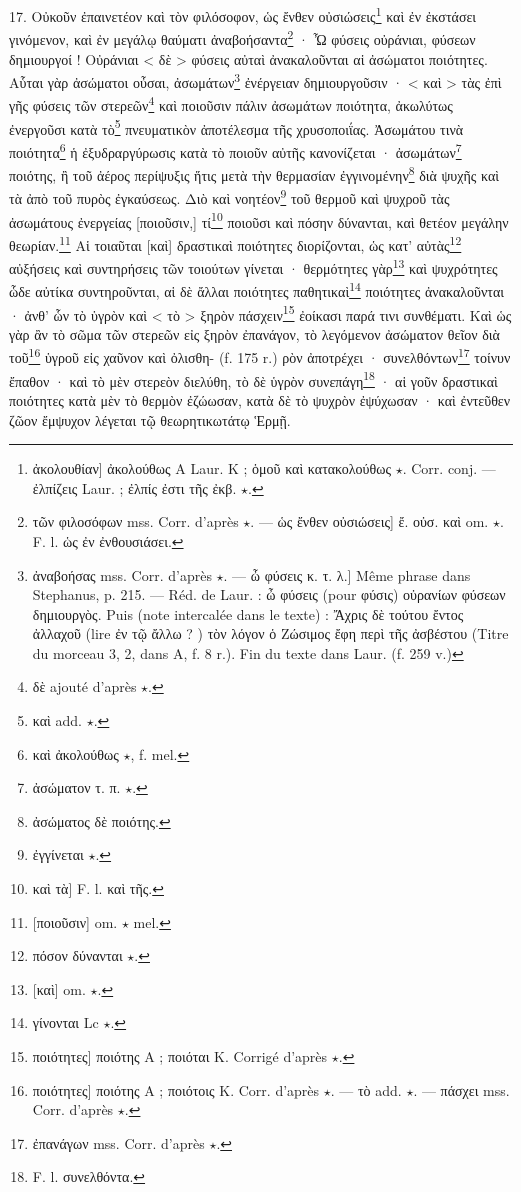 \documentclass[landscape, a4paper, 11pt, oneside, polutonikogreek, french]{article}
\begin{document}
17. Οὐκοῦν ἐπαινετέον καὶ τὸν φιλόσοφον, ὡς ἔνθεν οὐσιώσεις\footnote{ἀκολουθίαν] ἀκολούθως A Laur. K ; ὁμοῦ καὶ κατακολούθως $\star$. Corr. conj. --- ἐλπίζεις Laur. ; ἐλπίς ἐστι τῆς ἐκβ. $\star$.} καὶ ἐν ἐκστάσει γινόμενον, καὶ ἐν μεγάλῳ θαύματι ἀναβοήσαντα\footnote{τῶν φιλοσόφων mss. Corr. d'après $\star$. --- ὡς ἔνθεν οὐσιώσεις] ἔ. οὐσ. καὶ om. $\star$. F. l. ὡς ἐν ἐνθουσιάσει.} · Ὦ φύσεις οὐράνιαι, φύσεων δημιουργοί ! Οὐράνιαι < δὲ > φύσεις αὐταὶ ἀνακαλοῦνται αἱ ἀσώματοι ποιότητες. Αὗται γὰρ ἀσώματοι οὖσαι, ἀσωμάτων\footnote{ἀναβοήσας mss. Corr. d'après $\star$. --- ὦ φύσεις κ. τ. λ.] Même phrase dans Stephanus, p. 215. --- Réd. de Laur. : ὦ φύσεις (pour φύσις) οὐρανίων φύσεων δημιουργὸς. Puis (note intercalée dans le texte) : Ἄχρις δὲ τούτου ἔντος ἀλλαχοῦ (lire ἐν τῷ ἄλλω ? ) τὸν λόγον ὁ Ζώσιμος ἔφη περὶ τῆς ἀσβέστου (Titre du morceau 3, 2, dans A, f. 8 r.). Fin du texte dans Laur. (f. 259 v.)} ἐνέργειαν δημιουργοῦσιν · < καὶ > τὰς ἐπὶ γῆς φύσεις τῶν στερεῶν\footnote{δὲ ajouté d'après $\star$.} καὶ ποιοῦσιν πάλιν ἀσωμάτων ποιότητα, ἀκωλύτως ἐνεργοῦσι κατὰ τὸ\footnote{καὶ add. $\star$.} πνευματικὸν ἀποτέλεσμα τῆς χρυσοποιΐας. Ἀσωμάτου τινὰ ποιότητα\footnote{καὶ ἀκολούθως $\star$, f. mel.} ἡ ἐξυδραργύρωσις κατὰ τὸ ποιοῦν αὐτῆς κανονίζεται · ἀσωμάτων\footnote{ἀσώματον τ. π. $\star$.} ποιότης, ἢ τοῦ ἀέρος περίψυξις ἥτις μετὰ τὴν θερμασίαν ἐγγινομένην\footnote{ἀσώματος δὲ ποιότης.} διὰ ψυχῆς καὶ τὰ ἀπὸ τοῦ πυρὸς ἐγκαύσεως. Διὸ καὶ νοητέον\footnote{ἐγγίνεται $\star$.} τοῦ θερμοῦ καὶ ψυχροῦ τὰς ἀσωμάτους ἐνεργείας [ποιοῦσιν,] τί\footnote{καὶ τὰ] F. l. καὶ τῆς.} ποιοῦσι καὶ πόσην δύνανται, καὶ θετέον μεγάλην θεωρίαν.\footnote{[ποιοῦσιν] om. $\star$ mel.} Αἱ τοιαῦται [καὶ] δραστικαὶ ποιότητες διορίζονται, ὡς κατ' αὐτὰς\footnote{πόσον δύνανται $\star$.} αὐξήσεις καὶ συντηρήσεις τῶν τοιούτων γίνεται · θερμότητες γὰρ\footnote{[καὶ] om. $\star$.} καὶ ψυχρότητες ὧδε αὐτίκα συντηροῦνται, αἱ δὲ ἄλλαι ποιότητες παθητικαὶ\footnote{γίνονται Lc $\star$.} ποιότητες ἀνακαλοῦνται · ἀνθ' ὧν τὸ ὑγρὸν καὶ < τὸ > ξηρὸν πάσχειν\footnote{ποιότητες] ποιότης A ; ποιόται K. Corrigé d'après $\star$.} ἐοίκασι παρά τινι συνθέματι. Καὶ ὡς γὰρ ἂν τὸ σῶμα τῶν στερεῶν εἰς ξηρὸν ἐπανάγον, τὸ λεγόμενον ἀσώματον θεῖον διὰ τοῦ\footnote{ποιότητες] ποιότης A ; ποιότοις K. Corr. d'après $\star$. --- τὸ add. $\star$. --- πάσχει mss. Corr. d'après $\star$.} ὑγροῦ εἰς χαῦνον καὶ ὀλισθη- (f. 175 r.) ρὸν ἀποτρέχει · συνελθόντων\footnote{ἐπανάγων mss. Corr. d'après $\star$.} τοίνυν ἔπαθον · καὶ τὸ μὲν στερεὸν διελύθη, τὸ δὲ ὑγρὸν συνεπάγη\footnote{F. l. συνελθόντα.} · αἱ γοῦν δραστικαὶ ποιότητες κατὰ μὲν τὸ θερμὸν ἐζώωσαν, κατὰ δὲ τὸ ψυχρὸν ἐψύχωσαν · καὶ ἐντεῦθεν ζῶον ἔμψυχον λέγεται τῷ θεωρητικωτάτῳ Ἑρμῇ.
\end{document}
